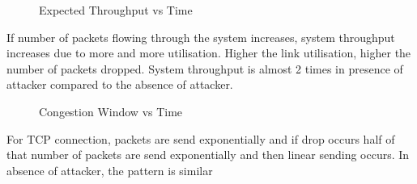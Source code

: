 \pagebreak

\begin{figure}[!htb]
	\centering
	\qquad
	\caption{{Expected Throughput vs Time}}
	\label{fig:figaf1}
\end{figure}

If number of packets flowing through the system increases, system throughput increases due to more and more utilisation. Higher the link utilisation, higher the number of packets dropped. System throughput is almost 2 times in presence of attacker compared to the absence of attacker.   


\begin{figure}[!htb]
	\centering
	\qquad
	\caption{{Congestion Window vs Time}}
	\label{fig:figaf1}
\end{figure}

For TCP connection, packets are send exponentially and if drop occurs half of that number of packets are send exponentially and then linear sending occurs. In absence of attacker, the pattern is similar 